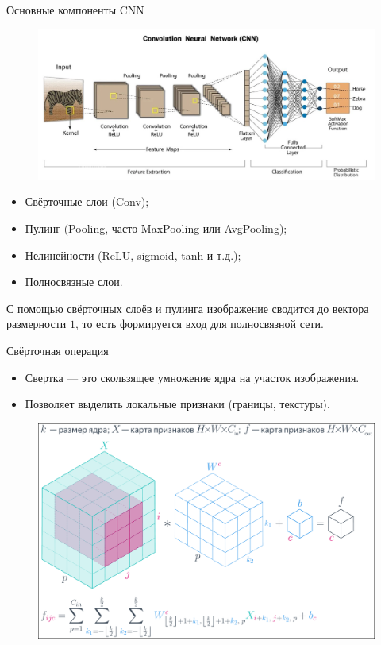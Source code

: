 \documentclass[notheorems, handout]{beamer}
\begin{document}
\begin{frame}{Основные компоненты CNN}
    \begin{figure}
        \includegraphics[width=0.8\linewidth]{img/conv_nn_layers.jpeg}    
    \end{figure}

    \begin{itemize}
        \item Свёрточные слои (Conv);
        \item Пулинг (Pooling, часто MaxPooling или AvgPooling);
        \item Нелинейности (ReLU, sigmoid, tanh и т.д.);
        \item Полносвязные слои.
    \end{itemize}

    С помощью свёрточных слоёв и пулинга изображение сводится до вектора размерности $1$, то есть формируется вход для полносвязной сети.
\end{frame}

\begin{frame}{Свёрточная операция}
    \begin{itemize}
        \item Свертка — это скользящее умножение ядра на участок изображения.
        \item Позволяет выделить локальные признаки (границы, текстуры).
    \end{itemize}


    \begin{figure}
        \includegraphics[width=0.9\linewidth]{img/conv_formula.png}
    \end{figure}
\end{frame}
\end{document}
